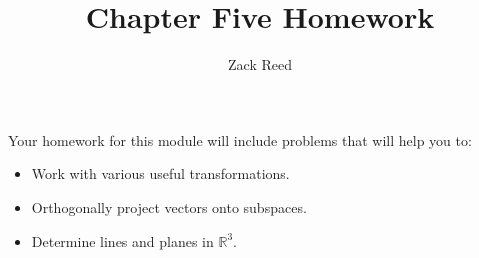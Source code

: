 \documentclass{ximera}
\author{Zack Reed}
\title{Chapter Five Homework}
\begin{document}
 
\begin{abstract}
\end{abstract}
 
\maketitle
 
Your homework for this module will include problems that will help you to:
 
\begin{itemize}
\item Work with various useful transformations.
\item Orthogonally project vectors onto subspaces.
\item Determine lines and planes in $\mathbb{R}^3$.
\end{itemize}
 
 
\end{document}
